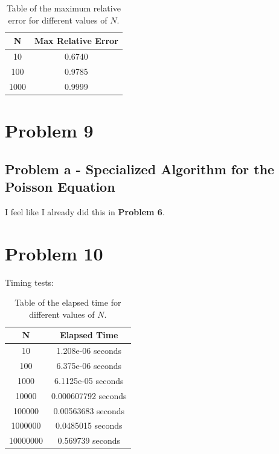 \documentclass[english,notitlepage]{revtex4-1}  %
\begin{document}
\begin{table}
    \centering
    \begin{tabular}{|c|c|}
        \hline
        \textbf{N} & \textbf{Max Relative Error} \\
        \hline
        10          & 0.6740                   \\
        100         & 0.9785                   \\
        1000        & 0.9999                   \\
        \hline
    \end{tabular}
    \caption{Table of the maximum relative error for different values of \( N \).}
    \label{tab:relative_error}
\end{table}

\section*{Problem 9}
\subsection*{Problem a - Specialized Algorithm for the Poisson Equation}
I feel like I already did this in \textbf{Problem 6}.

\section*{Problem 10}

Timing tests:

\begin{table}
    \centering
    \begin{tabular}{|c|c|}
        \hline
        \textbf{N} & \textbf{Elapsed Time} \\
        \hline
        10          & 1.208e-06 seconds      \\
        100         & 6.375e-06 seconds      \\
        1000        & 6.1125e-05 seconds     \\
        10000       & 0.000607792 seconds    \\
        100000      & 0.00563683 seconds     \\
        1000000     & 0.0485015 seconds      \\
        10000000    & 0.569739 seconds       \\
        \hline
    \end{tabular}
    \caption{Table of the elapsed time for different values of \( N \).}
    \label{tab:elapsed_time}
\end{table}
\end{document}
